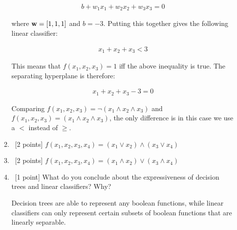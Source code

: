\documentclass[12pt, fullpage,letterpaper]{article}
\begin{document}
\begin{enumerate}
\begin{enumerate}
			\[
				\begin{split}
					b + w_1 x_1 + w_2 x_2 + w_3 x_3 = 0
				\end{split}
			\]
			
			where ${\bf w} = [1, 1, 1]$ and $b=-3$. Putting this together gives the following linear classifier:
			
			\[
				\begin{split}
					x_1 + x_2 + x_3 < 3
				\end{split}
			\]
			
			This means that $f(x_1, x_2, x_3) = 1$ iff the above inequality is true. The separating hyperplane is therefore:
			
			\[
				\begin{split}
					 x_1 + x_2 + x_3 - 3  = 0
				\end{split}
			\]
			
			Comparing $f(x_1, x_2, x_3) = \neg ( x_1 \land  x_2 \land  x_3 )$ and $f(x_1, x_2, x_3) =  ( x_1 \land  x_2 \land  x_3 )$, the only difference is in this case we use a $<$ instead of $\geq$.
		
		
		
		\item~[2 points] $f(x_1, x_2, x_3, x_4) = (x_1 \lor x_2) \land (x_3 \lor x_4)$
		
		
		\item~[2 points] $f(x_1, x_2, x_3, x_4) = (x_1 \land x_2) \lor (x_3 \land x_4)$
		
		
		\item~[1 point] What do you conclude about the expressiveness of decision trees and linear classifiers? Why?
		
		Decision trees are able to represent any boolean functions, while linear classifiers can only represent certain subsets of boolean functions that are linearly separable. 
		
	\end{enumerate}
		

\end{enumerate}
\end{document}
